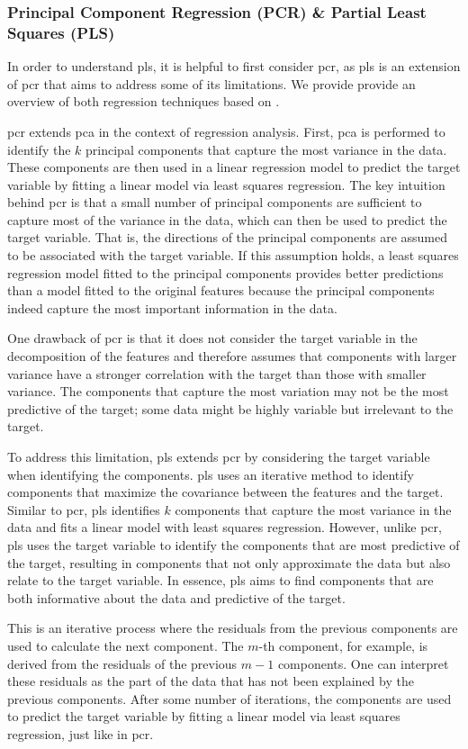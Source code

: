 \subsubsection{Principal Component Regression (PCR) \& Partial Least Squares (PLS)}\label{subsec:pls}
In order to understand \gls{pls}, it is helpful to first consider \gls{pcr}, as \gls{pls} is an extension of \gls{pcr} that aims to address some of its limitations.
We provide provide an overview of both regression techniques based on \citet{James2023AnIS}.

\gls{pcr} extends \gls{pca} in the context of regression analysis.
First, \gls{pca} is performed to identify the $k$ principal components that capture the most variance in the data.
These components are then used in a linear regression model to predict the target variable by fitting a linear model via least squares regression.
The key intuition behind \gls{pcr} is that a small number of principal components are sufficient to capture most of the variance in the data, which can then be used to predict the target variable.
That is, the directions of the principal components are assumed to be associated with the target variable.
If this assumption holds, a least squares regression model fitted to the principal components provides better predictions than a model fitted to the original features because the principal components indeed capture the most important information in the data.

One drawback of \gls{pcr} is that it does not consider the target variable in the decomposition of the features and therefore assumes that components with larger variance have a stronger correlation with the target than those with smaller variance.
The components that capture the most variation may not be the most predictive of the target; some data might be highly variable but irrelevant to the target.

To address this limitation, \gls{pls} extends \gls{pcr} by considering the target variable when identifying the components.
\gls{pls} uses an iterative method to identify components that maximize the covariance between the features and the target.
Similar to \gls{pcr}, \gls{pls} identifies $k$ components that capture the most variance in the data and fits a linear model with least squares regression.
However, unlike \gls{pcr}, \gls{pls} uses the target variable to identify the components that are most predictive of the target, resulting in components that not only approximate the data but also relate to the target variable.
In essence, \gls{pls} aims to find components that are both informative about the data and predictive of the target.

This is an iterative process where the residuals from the previous components are used to calculate the next component.
The $m$-th component, for example, is derived from the residuals of the previous $m-1$ components.
One can interpret these residuals as the part of the data that has not been explained by the previous components.
After some number of iterations, the components are used to predict the target variable by fitting a linear model via least squares regression, just like in \gls{pcr}.